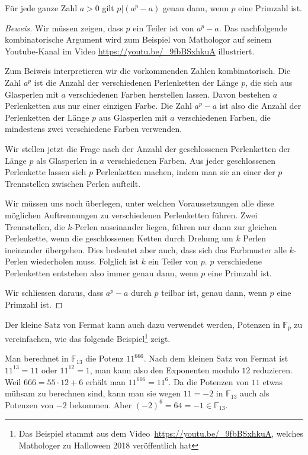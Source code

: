\begin{satz}
Für jede ganze Zahl $a>0$ gilt $p|(a^p-a)$ genau dann, wenn
$p$ eine Primzahl ist.
\end{satz}

\begin{proof}[Beweis]
Wir müssen zeigen, dass $p$ ein Teiler ist von $a^p-a$.
Das nachfolgende kombinatorische Argument wird zum Beispiel
von Mathologor auf seinem Youtube-Kanal im Video
\url{https://youtu.be/_9fbBSxhkuA} illustriert.

Zum Beiweis interpretieren wir die vorkommenden Zahlen kombinatorisch.
Die Zahl $a^p$ ist die Anzahl der verschiedenen Perlenketten der Länge
$p$, die sich aus Glasperlen mit $a$ verschiedenen Farben herstellen
lassen.
Davon bestehen $a$ Perlenketten aus nur einer einzigen Farbe.
Die Zahl $a^p-a$ ist also die Anzahl der Perlenketten der Länge $p$
aus Glasperlen mit $a$ verschiedenen Farben, die mindestens zwei
verschiedene Farben verwenden.

Wir stellen jetzt die Frage nach der Anzahl der geschlossenen
Perlenketten der Länge $p$ als Glasperlen in $a$ verschiedenen Farben.
Aus jeder geschlossenen Perlenkette lassen sich $p$ Perlenketten machen,
indem man sie an einer der $p$ Trennstellen zwischen Perlen aufteilt.

Wir müssen uns noch überlegen, unter welchen Voraussetzungen 
alle diese möglichen Auftrennungen zu verschiedenen Perlenketten
führen.
Zwei Trennstellen, die $k$-Perlen auseinander liegen, führen nur dann
zur gleichen Perlenkette, wenn die geschlossenen Ketten durch Drehung 
um $k$ Perlen ineinander übergehen.
Dies bedeutet aber auch, dass sich das Farbmuster alle $k$-Perlen
wiederholen muss.
Folglich ist $k$ ein Teiler von $p$.
$p$ verschiedene Perlenketten entstehen also immer genau dann, wenn $p$
eine Primzahl ist.

Wir schliessen daraus, dass $a^p-a$ durch $p$ teilbar ist, genau dann,
wenn $p$ eine Primzahl ist.
\end{proof}

Der kleine Satz von Fermat kann auch dazu verwendet werden, Potenzen 
in $\mathbb{F}_p$ zu vereinfachen, wie das folgende Beispiel\footnote{%
Das Beispiel stammt aus dem Video~\url{https://youtu.be/_9fbBSxhkuA},
welches Mathologer zu Halloween 2018 veröffentlich hat}
zeigt.

\begin{beispiel}
Man berechnet in $\mathbb{F}_{13}$ die Potenz $11^{666}$.
Nach dem kleinen Satz von Fermat ist $11^{13} = 11$ oder $11^{12}=1$,
man kann also den Exponenten modulo $12$ reduzieren.
Weil $666=55\cdot 12 + 6$ erhält man $11^{666}= 11^6$.
Da die Potenzen von $11$ etwas mühsam zu berechnen sind,
kann man sie wegen $11=-2$ in $\mathbb{F}_{13}$ auch als Potenzen
von $-2$ bekommen.
Aber $(-2)^6 = 64 = -1 \in\mathbb{F}_{13}$.
\end{beispiel}

